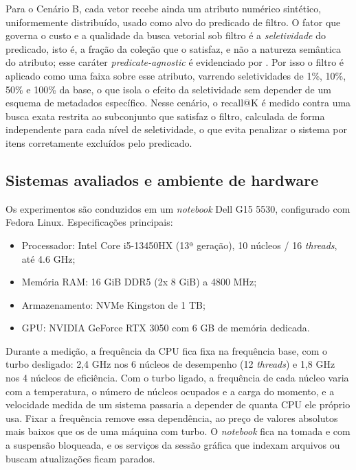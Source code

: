 Para o Cenário B, cada vetor recebe ainda um atributo numérico sintético, uniformemente distribuído, usado como alvo do predicado de filtro. O fator que governa o custo e a qualidade da busca vetorial sob filtro é a \textit{seletividade} do predicado, isto é, a fração da coleção que o satisfaz, e não a natureza semântica do atributo; esse caráter \textit{predicate-agnostic} é evidenciado por . Por isso o filtro é aplicado como uma faixa sobre esse atributo, varrendo seletividades de 1\%, 10\%, 50\% e 100\% da base, o que isola o efeito da seletividade sem depender de um esquema de metadados específico. Nesse cenário, o recall@K é medido contra uma busca exata restrita ao subconjunto que satisfaz o filtro, calculada de forma independente para cada nível de seletividade, o que evita penalizar o sistema por itens corretamente excluídos pelo predicado.

\subsection{Sistemas avaliados e ambiente de hardware}
\label{sec:hardware}

Os experimentos são conduzidos em um \textit{notebook} Dell G15 5530, configurado com Fedora Linux. Especificações principais:

\begin{itemize}
    \item Processador: Intel Core i5-13450HX (13ª geração), 10 núcleos / 16 \textit{threads}, até 4.6 GHz;
    \item Memória RAM: 16 GiB DDR5 (2x 8 GiB) a 4800 MHz;
    \item Armazenamento: NVMe Kingston de 1 TB;
    \item GPU: NVIDIA GeForce RTX 3050 com 6 GB de memória dedicada.
\end{itemize}

Durante a medição, a frequência da CPU fica fixa na frequência base, com o turbo desligado: 2,4 GHz nos 6 núcleos de desempenho (12 \textit{threads}) e 1,8 GHz nos 4 núcleos de eficiência. Com o turbo ligado, a frequência de cada núcleo varia com a temperatura, o número de núcleos ocupados e a carga do momento, e a velocidade medida de um sistema passaria a depender de quanta CPU ele próprio usa. Fixar a frequência remove essa dependência, ao preço de valores absolutos mais baixos que os de uma máquina com turbo. O \textit{notebook} fica na tomada e com a suspensão bloqueada, e os serviços da sessão gráfica que indexam arquivos ou buscam atualizações ficam parados.

